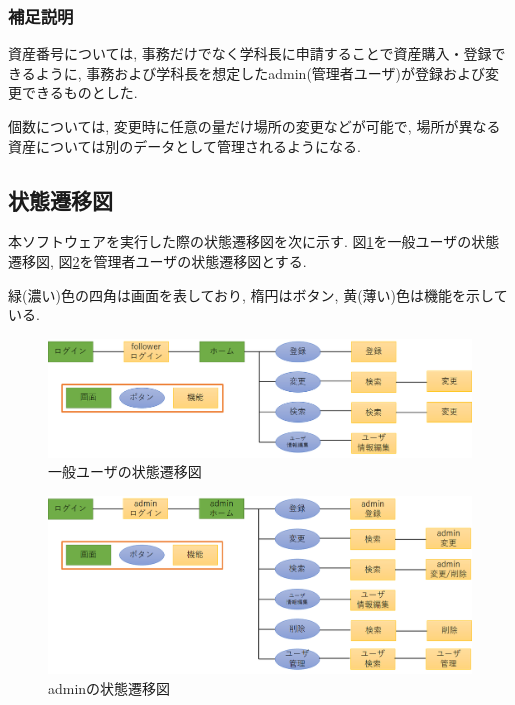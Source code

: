 \documentclass[11ptm]{jsarticle}
\begin{document}
\subsubsection{補足説明}
\label{subsubsec:補足説明}
資産番号については, 事務だけでなく学科長に申請することで資産購入・登録できるように, 事務および学科長を想定したadmin(管理者ユーザ)が登録および変更できるものとした. \par
個数については, 変更時に任意の量だけ場所の変更などが可能で, 場所が異なる資産については別のデータとして管理されるようになる. 

\clearpage
\subsection{状態遷移図}
\label{subsec:状態遷移図}
本ソフトウェアを実行した際の状態遷移図を次に示す. 図\ref{fig:一般ユーザの状態遷移図}を一般ユーザの状態遷移図, 図\ref{fig:adminの状態遷移図}を管理者ユーザの状態遷移図とする. \par
緑(濃い)色の四角は画面を表しており, 楕円はボタン, 黄(薄い)色は機能を示している.
\begin{figure}[h]
  \centering
  \includegraphics[keepaspectratio, width=0.8\linewidth]{follower_transition-diagram.png}
  \caption{\label{fig:一般ユーザの状態遷移図}一般ユーザの状態遷移図}
\end{figure}\par

\begin{figure}[h]
  \centering
  \includegraphics[keepaspectratio, width=0.8\linewidth]{admin_transition-diagram.png}
  \caption{\label{fig:adminの状態遷移図}adminの状態遷移図}
\end{figure}\par
\end{document}
